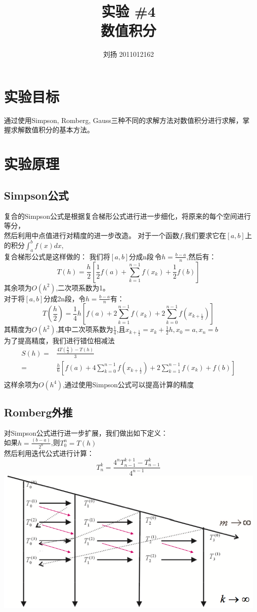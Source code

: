 \documentclass{article}
\title{
\textbf{实验 \#4\\ 
数值积分}
}
\author{刘扬 2011012162}
\date{} %
\begin{document}
\maketitle
\section{实验目标}
通过使用Simpson, Romberg, Gauss三种不同的求解方法对数值积分进行求解，掌握求解数值积分的基本方法。
\section{实验原理}
\subsection{Simpson公式}
复合的Simpson公式是根据复合梯形公式进行进一步细化，将原来的每个空间进行等分，\\然后利用中点值进行对精度的进一步改造。
对于一个函数$f$,我们要求它在$[a,b]$上的积分$\int_a^b{f(x)dx}$,\\复合梯形公式是这样做的：
我们将$[a,b]$分成n段\,令$h=\frac{b-a}{n}$,然后有：
$$
T(h) = \frac{h}{2}\left[\frac{1}{2}f(a)+\sum_{k=1}^{n-1}{f(x_k)}+\frac{1}{2}f(b)\right]
$$
其余项为$O(h^2)$,二次项系数为1。\\
对于将$[a,b]$分成2n段，令$h=\frac{b-a}{n}$有：
$$
T(\frac{h}{2}) = \frac{1}{4}h \left[ f(a)+ 2\sum_{k=1}^{n-1}{f(x_k)} + 2 \sum_{k=0}^{n-1}{f(x_{k+\frac{1}{2}})}\right]
$$
其精度为$O(h^2)$,其中二次项系数为$\frac{1}{4}$,且$x_{k+\frac{1}{2}}=x_k+\frac{1}{2}h,x_0=a,x_n=b$\\

为了提高精度，我们进行错位相减法
\begin{align}
S(h) = & \frac{4T(\frac{h}{2})-T(h)}{3}\\
     = &  \frac{h}{6}\left[ f(a) + 4\sum_{k=0}^{n-1}{f(x_{k+\frac{1}{2}})} + 2\sum_{k=1}^{n-1}{f(x_k)} +f(b) \right]\\
\end{align}
这样余项为$O(h^4)$,通过使用Simpson公式可以提高计算的精度
\subsection{Romberg外推}
对Simpson公式进行进一步扩展，我们做出如下定义：\\
如果$h = \frac{(b-a)}{2^n}$,则$T_0^{n}=T(h)$\\
然后利用迭代公式进行计算：
$$T^k_n = \frac{4^nT_{n-1}^{k+1} - T^{k}_{n-1}}{4^{n-1}}$$
\includegraphics[width=0.75\columnwidth]{graph}\\
\end{document}
